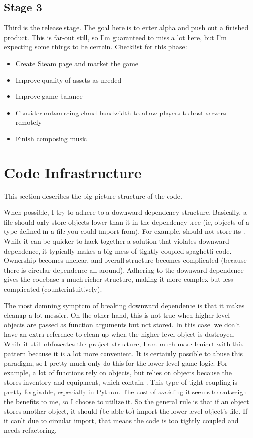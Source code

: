 \documentclass{article}
\begin{document}
\subsection{Stage 3}
Third is the release stage. The goal here is to enter alpha and push out a finished product.
This is far-out still, so I'm guaranteed to miss a lot here, but I'm expecting some things to
be certain.
Checklist for this phase:
\begin{itemize}
    \item Create Steam page and market the game
    \item Improve quality of assets as needed
    \item Improve game balance
    \item Consider outsourcing cloud bandwidth to allow players to host servers remotely
    \item Finish composing music
\end{itemize}

\section{Code Infrastructure}
This section describes the big-picture structure of the code.

When possible, I try to adhere to a downward dependency structure. Basically, a file
should only store objects lower than it in the dependency tree (ie, objects of a type defined
in a file you could import from). For example,  should not store its
. While it can be quicker to hack together a solution that violates downward
dependence, it typically makes a big mess of tightly coupled spaghetti code. Ownership becomes unclear,
and overall structure becomes complicated (because there is circular dependence all around). Adhering
to the downward dependence gives the codebase a much richer structure, making it more complex but less
complicated (counterintuitively).

The most damning symptom of breaking downward dependence is that it makes cleanup a lot messier.
On the other hand, this is not true when higher level objects are passed as function arguments but
not stored. In this case, we don't have an extra reference to clean up when the higher level
object is destroyed. While it still obfuscates the project structure, I am much more lenient
with this pattern because it is a lot more convenient. It is certainly possible to abuse this
paradigm, so I pretty much only do this for the lower-level game logic.  For example, a lot of
 functions rely on  objects, but  relies
on  objects because the  stores inventory and equipment, which
contain . This type
of tight coupling is pretty forgivable, especially in Python. The cost of avoiding it seems to outweigh
the benefits to me, so I choose to utilize it. So the general rule is that if an object stores another
object, it should (be able to) import the lower level object's file. If it can't due to circular import,
that means the code is too tightly coupled and needs refactoring.
\end{document}
